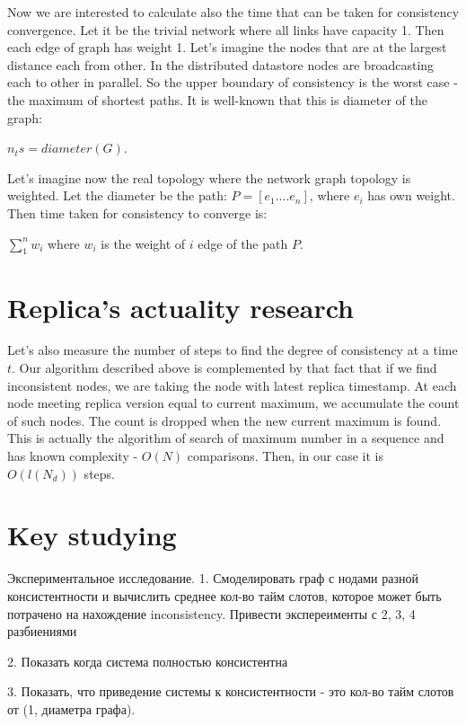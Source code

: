 \documentclass{llncs}
\begin{document}
Now we are interested to calculate also the time that can be taken for consistency convergence.
Let it be the trivial network where all links have capacity 1. Then each edge of graph has weight 1.
Let's imagine the nodes that are at the largest distance each from other. In the distributed datastore nodes are
broadcasting each to other in parallel. So the upper boundary of consistency is the worst case - the maximum of 
shortest paths. It is well-known that this is diameter of the graph:

$n_ts = diameter(G)$.

Let's imagine now the real topology where the network graph topology is weighted.
Let the diameter be the path:
$P = [e_1....e_n]$, where $e_i$ has own weight.
Then time taken for consistency to converge is:

$\sum_1^{n}w_i$ where $w_i$ is the weight of $i$ edge of the path $P$.



\section{Replica's actuality research}

Let's also measure the number of steps to find the degree of consistency at a time $t$.
Our algorithm described above is complemented by that fact that if we find inconsistent nodes,
we are taking the node with latest replica timestamp. At each node meeting replica version equal to current maximum, we accumulate the count of such nodes. The count is dropped when the new current maximum is found. This is actually the algorithm of search of maximum number in a sequence and has known complexity - $O(N)$ comparisons.
Then, in our case it is $O(l(N_d))$ steps.



\section{Key studying}\label{sec:experiments}

Экспериментальное исследование.
1. Смоделировать граф с нодами разной консистентности и вычислить среднее кол-во тайм слотов, которое может быть потрачено на нахождение inconsistency.
Привести экспереименты с 2, 3, 4 разбиениями

2. Показать когда система полностью консистентна

3. Показать, что приведение системы к консистентности - это кол-во тайм слотов от (1, диаметра графа).
\end{document}
